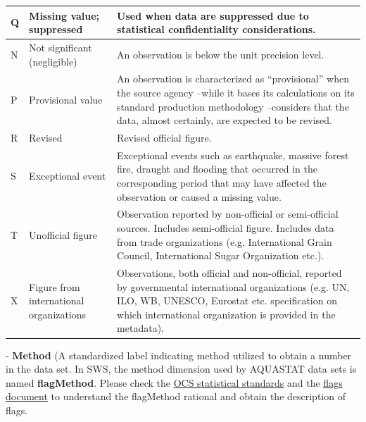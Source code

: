 \documentclass[
]{book}
\begin{document}
\begin{table}
\begin{tabular}[t]{l|l|l}
\hline
Q & Missing value; suppressed & Used when data are suppressed due to statistical confidentiality considerations.\\
\hline
N & Not significant (negligible) & An observation is below the unit precision level.\\
\hline
P & Provisional value & An observation is characterized as “provisional” when the source agency –while it bases its calculations on its standard production methodology –considers that the data, almost certainly, are expected to be revised.\\
\hline
R & Revised & Revised official figure.\\
\hline
S & Exceptional event & Exceptional events such as earthquake, massive forest fire, draught and flooding that occurred in the corresponding period that may have affected the observation or caused a missing value.\\
\hline
T & Unofficial figure & Observation reported by non-official or semi-official sources. Includes semi-official figure. Includes data from trade organizations (e.g. International Grain Council, International Sugar Organization etc.).\\
\hline
X & Figure from international organizations & Observations, both official and non-official, reported by governmental international organizations (e.g. UN, ILO, WB, UNESCO, Eurostat etc. specification on which international organization is provided in the metadata).\\
\hline
\end{tabular}
\end{table}

- \textbf{Method} (A standardized label indicating method utilized to obtain a number in the data set. In SWS, the method dimension used by AQUASTAT data sets is named \textbf{flagMethod}. Please check the \href{http://intranet.fao.org/statistics_coordination_portal/standards_for_quality_compliance/}{OCS statistical standards} and the \href{http://intranet.fao.org/fileadmin/user_upload/scp/Standards_for_quality_compliance/SSS_Observation_Status_Codes__Flags__endorsed__December_2016_.pdf}{flags document} to understand the flagMethod rational and obtain the description of flags.
\end{document}
